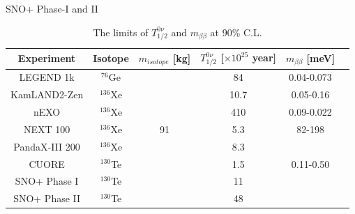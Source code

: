 SNO+ Phase-I and II 

\begin{table}[ht]
	\caption{\label{newLimits} The limits of $T^{0\nu}_{1/2}$ and $m_{\beta\beta}$ at 90\% C.L.}	
	{\centering
		\begin{tabular*}{135mm}{c@{\extracolsep{\fill}}ccccc}
			\toprule 
			Experiment & Isotope & $m_{isotope}$ [kg] & $T^{0\nu}_{1/2}$ [$\times 10^{25}$ year] & $m_{\beta\beta}$ [meV]\\
			\midrule
			LEGEND 1k & $^{76}$Ge & & 84 & 0.04-0.073\\
			KamLAND2-Zen & $^{136}$Xe & & 10.7 & 0.05-0.16	\\
			nEXO         & $^{136}$Xe & & 410 & 0.09-0.022  \\
			NEXT 100& $^{136}$Xe& 91 &  5.3 & 82-198\\
			PandaX-III 200& $^{136}$Xe & & 8.3 &\\	
			CUORE       & $^{130}$Te&  & 1.5 &  0.11-0.50 \\
			SNO+ Phase I &$^{130}$Te&  &11\\
			SNO+ Phase II &$^{130}$Te&  &48\\
			\bottomrule	
		\end{tabular*}
	}
\end{table}
\vspace{1cm}